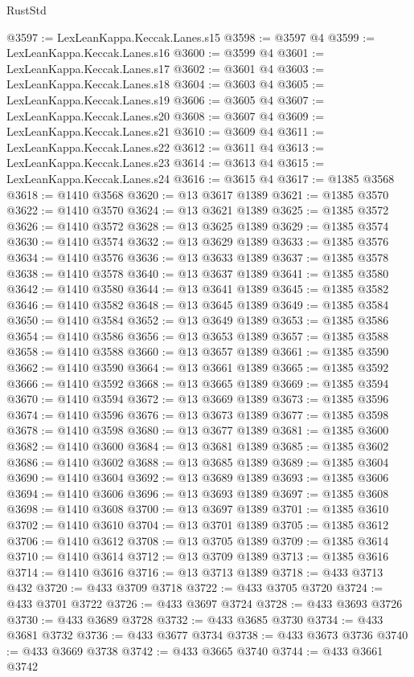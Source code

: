 \begin{lexlean}{RustStd}
\begin{coremodule}
@3597 := LexLeanKappa.Keccak.Lanes.s15
@3598 := @3597 @4
@3599 := LexLeanKappa.Keccak.Lanes.s16
@3600 := @3599 @4
@3601 := LexLeanKappa.Keccak.Lanes.s17
@3602 := @3601 @4
@3603 := LexLeanKappa.Keccak.Lanes.s18
@3604 := @3603 @4
@3605 := LexLeanKappa.Keccak.Lanes.s19
@3606 := @3605 @4
@3607 := LexLeanKappa.Keccak.Lanes.s20
@3608 := @3607 @4
@3609 := LexLeanKappa.Keccak.Lanes.s21
@3610 := @3609 @4
@3611 := LexLeanKappa.Keccak.Lanes.s22
@3612 := @3611 @4
@3613 := LexLeanKappa.Keccak.Lanes.s23
@3614 := @3613 @4
@3615 := LexLeanKappa.Keccak.Lanes.s24
@3616 := @3615 @4
@3617 := @1385 @3568
@3618 := @1410 @3568
@3620 := @13 @3617 @1389
@3621 := @1385 @3570
@3622 := @1410 @3570
@3624 := @13 @3621 @1389
@3625 := @1385 @3572
@3626 := @1410 @3572
@3628 := @13 @3625 @1389
@3629 := @1385 @3574
@3630 := @1410 @3574
@3632 := @13 @3629 @1389
@3633 := @1385 @3576
@3634 := @1410 @3576
@3636 := @13 @3633 @1389
@3637 := @1385 @3578
@3638 := @1410 @3578
@3640 := @13 @3637 @1389
@3641 := @1385 @3580
@3642 := @1410 @3580
@3644 := @13 @3641 @1389
@3645 := @1385 @3582
@3646 := @1410 @3582
@3648 := @13 @3645 @1389
@3649 := @1385 @3584
@3650 := @1410 @3584
@3652 := @13 @3649 @1389
@3653 := @1385 @3586
@3654 := @1410 @3586
@3656 := @13 @3653 @1389
@3657 := @1385 @3588
@3658 := @1410 @3588
@3660 := @13 @3657 @1389
@3661 := @1385 @3590
@3662 := @1410 @3590
@3664 := @13 @3661 @1389
@3665 := @1385 @3592
@3666 := @1410 @3592
@3668 := @13 @3665 @1389
@3669 := @1385 @3594
@3670 := @1410 @3594
@3672 := @13 @3669 @1389
@3673 := @1385 @3596
@3674 := @1410 @3596
@3676 := @13 @3673 @1389
@3677 := @1385 @3598
@3678 := @1410 @3598
@3680 := @13 @3677 @1389
@3681 := @1385 @3600
@3682 := @1410 @3600
@3684 := @13 @3681 @1389
@3685 := @1385 @3602
@3686 := @1410 @3602
@3688 := @13 @3685 @1389
@3689 := @1385 @3604
@3690 := @1410 @3604
@3692 := @13 @3689 @1389
@3693 := @1385 @3606
@3694 := @1410 @3606
@3696 := @13 @3693 @1389
@3697 := @1385 @3608
@3698 := @1410 @3608
@3700 := @13 @3697 @1389
@3701 := @1385 @3610
@3702 := @1410 @3610
@3704 := @13 @3701 @1389
@3705 := @1385 @3612
@3706 := @1410 @3612
@3708 := @13 @3705 @1389
@3709 := @1385 @3614
@3710 := @1410 @3614
@3712 := @13 @3709 @1389
@3713 := @1385 @3616
@3714 := @1410 @3616
@3716 := @13 @3713 @1389
@3718 := @433 @3713 @432
@3720 := @433 @3709 @3718
@3722 := @433 @3705 @3720
@3724 := @433 @3701 @3722
@3726 := @433 @3697 @3724
@3728 := @433 @3693 @3726
@3730 := @433 @3689 @3728
@3732 := @433 @3685 @3730
@3734 := @433 @3681 @3732
@3736 := @433 @3677 @3734
@3738 := @433 @3673 @3736
@3740 := @433 @3669 @3738
@3742 := @433 @3665 @3740
@3744 := @433 @3661 @3742

\end{coremodule}
\end{lexlean}
